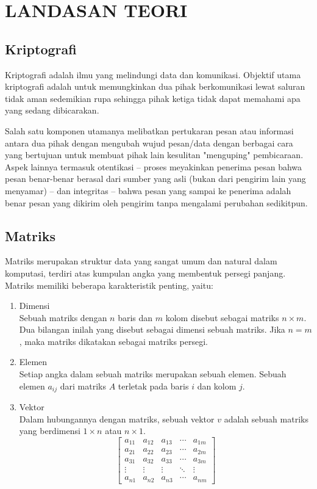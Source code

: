\chapter{LANDASAN TEORI}

%
\vspace{12pt}


\section{Kriptografi}
Kriptografi adalah ilmu yang melindungi data dan komunikasi. Objektif utama
kriptografi adalah untuk memungkinkan dua pihak berkomunikasi lewat saluran
tidak aman sedemikian rupa sehingga pihak ketiga tidak dapat memahami apa yang
sedang dibicarakan.\par
Salah satu komponen utamanya melibatkan pertukaran pesan atau informasi antara
dua pihak dengan mengubah wujud pesan/data dengan berbagai cara yang bertujuan
untuk membuat pihak lain kesulitan "menguping" pembicaraan. Aspek lainnya
termasuk otentikasi -- proses meyakinkan penerima pesan bahwa pesan benar-benar
berasal dari sumber yang asli (bukan dari pengirim lain yang menyamar) -- dan
integritas -- bahwa pesan yang sampai ke penerima adalah benar pesan yang
dikirim oleh pengirim tanpa mengalami perubahan sedikitpun.
\section{Matriks}
Matriks merupakan struktur data yang sangat umum dan natural dalam komputasi,
terdiri atas kumpulan angka yang membentuk persegi panjang. Matriks memiliki
beberapa karakteristik penting, yaitu:
\begin{enumerate}[label=\alph*.]
\item Dimensi\\Sebuah matriks dengan $n$ baris dan $m$ kolom disebut sebagai matriks $n\times m$.
Dua bilangan inilah yang disebut sebagai dimensi sebuah matriks. Jika $n = m$, maka
matriks dikatakan sebagai matriks persegi.
\item Elemen\\Setiap angka dalam sebuah matriks merupakan sebuah elemen. Sebuah
elemen $a_{ij}$ dari matriks $A$ terletak pada baris $i$ dan kolom $j$.
\item Vektor\\Dalam hubungannya dengan matriks, sebuah vektor $v$ adalah sebuah
matriks yang berdimensi $1\times n$ atau $n\times 1$.
\[
\begin{bmatrix}
  a_{11} & a_{12} & a_{13} & \cdots & a_{1m} \\
  a_{21} & a_{22} & a_{23} & \cdots & a_{2m} \\
  a_{31} & a_{32} & a_{33} & \cdots & a_{3m} \\
  \vdots  & \vdots  & \vdots & \ddots & \vdots  \\
  a_{n1} & a_{n2} & a_{n3} & \cdots & a_{nm} 
 \end{bmatrix}
 \]
\end{enumerate}

